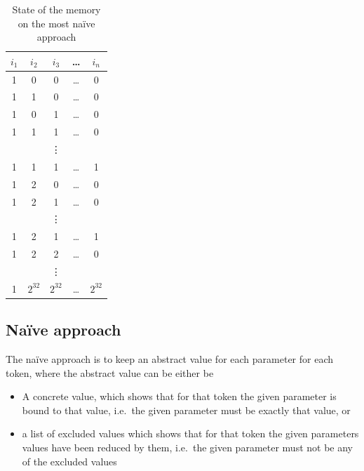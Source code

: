 	\begin{table}
	\caption{State of the memory on the most na\"ive approach}		
	\label{tab:algo:memory}
	\centering
	\begin{tabular}{ccccc}
		\toprule
		$i_1$ &  $i_2$   &  $i_3$   & \dots &  $i_n$   \\ \midrule
		  1   &    0     &    0     & \dots &    0     \\
		  1   &    1     &    0     & \dots &    0     \\
		  1   &    0     &    1     & \dots &    0     \\
		  1   &    1     &    1     & \dots &    0     \\
		      &          &  \vdots  &       &  \\
		  1   &    1     &    1     & \dots &    1     \\
		  1   &    2     &    0     & \dots &    0     \\
		  1   &    2     &    1     & \dots &    0     \\
		      &          &  \vdots  &       &  \\
		  1   &    2     &    1     & \dots &    1     \\
		  1   &    2     &    2     & \dots &    0     \\
		      &          &  \vdots  &       &  \\
		  1   & $2^{32}$ & $2^{32}$ & \dots & $2^{32}$ \\ \bottomrule
	\end{tabular}
	\end{table}
	
	\subsection{Na\"ive approach}	

	The na\"ive approach is to keep an abstract value for each parameter for each token,
	where the abstract value can be either be
	\begin{itemize}
		\item A concrete value, which shows that for that token the given parameter is bound to that value, i.e.~the given parameter must be exactly that value, or
		\item a list of excluded values which shows that for that token the given parameters values have been reduced by them, i.e.~the given parameter must not be any of the excluded values
	\end{itemize}

